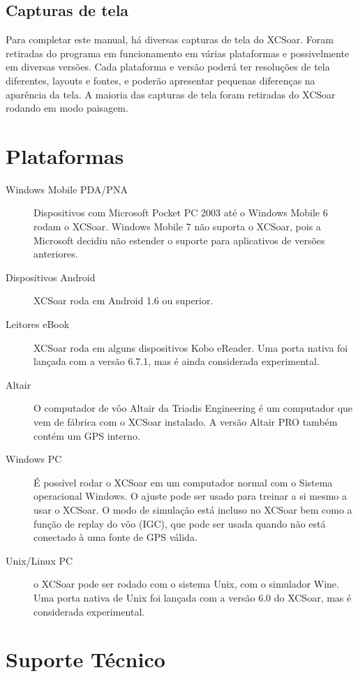 \subsection*{Capturas de tela}
Para completar este manual, há diversas capturas de tela do XCSoar.  Foram retiradas do programa em funcionamento em várias plataformas e possivelmente em diversas versões.  Cada plataforma e versão poderá ter resoluções de tela diferentes, layouts e fontes, e poderão apresentar pequenas diferenças na aparência da tela.  A maioria das capturas de tela foram retiradas do XCSoar rodando em modo paisagem.

\section{Plataformas}
\begin{description}
\item[Windows Mobile PDA/PNA]
Dispositivos com Microsoft Pocket PC 2003 até o Windows Mobile 6 rodam o XCSoar.   Windows Mobile 7 não suporta o XCSoar, pois a Microsoft decidiu não estender o suporte para aplicativos de versões anteriores.
\item[Dispositivos Android]
XCSoar roda em Android 1.6 ou superior.
\item [Leitores eBook]
XCSoar roda em alguns dispositivos Kobo eReader.  Uma porta nativa foi lançada com a versão 6.7.1, mas é ainda considerada experimental.
\item[Altair]
O computador de vôo Altair da Triadis Engineering é um computador que vem de fábrica com o XCSoar instalado.  A versão Altair PRO também contém um GPS interno.
\item[Windows PC]
É possível rodar o XCSoar em um computador normal com o Sistema operacional Windows.  O ajuste pode ser usado para treinar a si mesmo a usar o XCSoar.  O modo de simulação está incluso no XCSoar bem como a função de replay do vôo (IGC), que pode ser usada quando não está conectado à uma fonte de GPS válida.
\item[Unix/Linux PC]
o XCSoar pode ser rodado com o sistema Unix, com o simulador Wine.  Uma porta nativa de Unix foi lançada com a versão 6.0 do XCSoar, mas é considerada experimental.
\end{description}



\section{Suporte Técnico}

